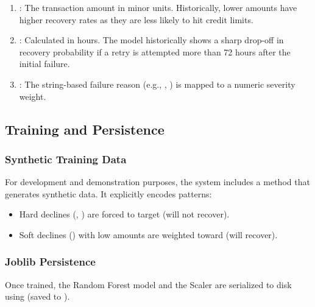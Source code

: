 \begin{tcolorbox}[featurebox={Engineered Features}]
\begin{enumerate}
    \item {}: The transaction amount in minor units. Historically, lower amounts have higher recovery rates as they are less likely to hit credit limits.
    \item {}: Calculated in hours. The model historically shows a sharp drop-off in recovery probability if a retry is attempted more than 72 hours after the initial failure.
    \item {}: The string-based failure reason (e.g., , ) is mapped to a numeric severity weight.
\end{enumerate}
\end{tcolorbox}

\vspace{0.8cm}

\subsection{Training and Persistence}

\subsubsection{Synthetic Training Data}
For development and demonstration purposes, the system includes a  method that generates synthetic data. It explicitly encodes patterns:
\begin{itemize}
    \item Hard declines (, ) are forced to target  (will not recover).
    \item Soft declines () with low amounts are weighted toward  (will recover).
\end{itemize}

\subsubsection{Joblib Persistence}
Once trained, the Random Forest model and the Scaler are serialized to disk using  (saved to ). 

